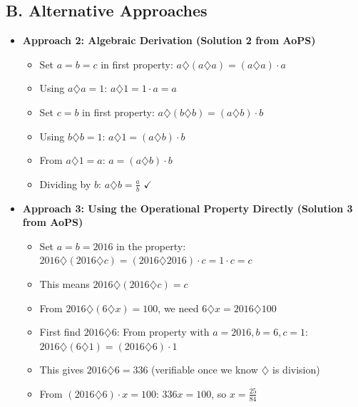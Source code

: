 \documentclass[11pt]{article}
\begin{document}
\begin{roadmapbox}
\subsection*{B. Alternative Approaches}
\begin{itemize}[leftmargin=*]
    \item \textbf{Approach 2: Algebraic Derivation (Solution 2 from AoPS)}
    \begin{itemize}
        \item Set $a=b=c$ in first property: $a \diamondsuit (a \diamondsuit a) = (a \diamondsuit a) \cdot a$
        \item Using $a \diamondsuit a = 1$: $a \diamondsuit 1 = 1 \cdot a = a$
        \item Set $c = b$ in first property: $a \diamondsuit (b \diamondsuit b) = (a \diamondsuit b) \cdot b$
        \item Using $b \diamondsuit b = 1$: $a \diamondsuit 1 = (a \diamondsuit b) \cdot b$
        \item From $a \diamondsuit 1 = a$: $a = (a \diamondsuit b) \cdot b$
        \item Dividing by $b$: $a \diamondsuit b = \frac{a}{b}$ $\checkmark$
    \end{itemize}
    
    \item \textbf{Approach 3: Using the Operational Property Directly (Solution 3 from AoPS)}
    \begin{itemize}
        \item Set $a = b = 2016$ in the property: $2016 \diamondsuit (2016 \diamondsuit c) = (2016 \diamondsuit 2016) \cdot c = 1 \cdot c = c$
        \item This means $2016 \diamondsuit (2016 \diamondsuit c) = c$
        \item From $2016 \diamondsuit (6 \diamondsuit x) = 100$, we need $6 \diamondsuit x = 2016 \diamondsuit 100$
        \item First find $2016 \diamondsuit 6$: From property with $a=2016, b=6, c=1$: $2016 \diamondsuit (6 \diamondsuit 1) = (2016 \diamondsuit 6) \cdot 1$
        \item This gives $2016 \diamondsuit 6 = 336$ (verifiable once we know $\diamondsuit$ is division)
        \item From $(2016 \diamondsuit 6) \cdot x = 100$: $336x = 100$, so $x = \frac{25}{84}$
    \end{itemize}
\end{itemize}


\end{roadmapbox}
\end{document}
